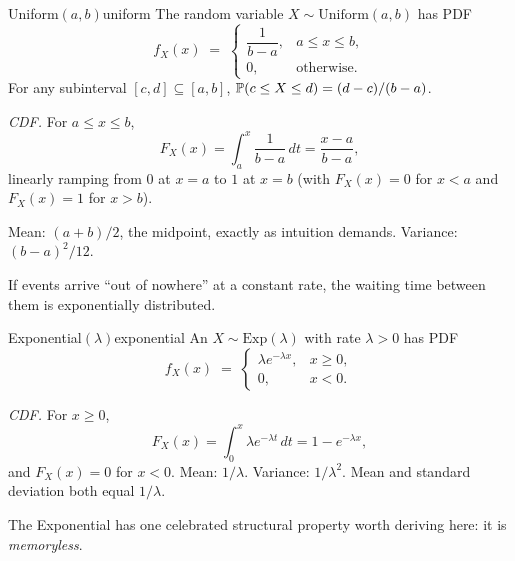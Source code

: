 \begin{example}{Uniform$(a, b)$}{uniform}
The  random variable $X \sim \mathrm{Uniform}(a, b)$ has PDF
\[
f_X(x) \;=\; \begin{cases} \dfrac{1}{b - a}, & a \le x \le b, \\ 0, & \text{otherwise.} \end{cases}
\]
For any subinterval $[c, d] \subseteq [a, b]$, $\mathbb{P}(c \le X \le d) = (d - c) / (b - a)$.

\textit{CDF.} For $a \le x \le b$,
\[
F_X(x) = \int_a^x \frac{1}{b - a}\, dt = \frac{x - a}{b - a},
\]
linearly ramping from $0$ at $x = a$ to $1$ at $x = b$ (with $F_X(x) = 0$ for $x < a$ and $F_X(x) = 1$ for $x > b$).

Mean: $(a + b)/2$, the midpoint, exactly as intuition demands. Variance: $(b - a)^2 / 12$.
\end{example}



If events arrive ``out of nowhere'' at a constant rate, the waiting time between them is exponentially distributed.

\begin{example}{Exponential$(\lambda)$}{exponential}
An  $X \sim \mathrm{Exp}(\lambda)$ with rate $\lambda > 0$ has PDF
\[
f_X(x) \;=\; \begin{cases} \lambda e^{-\lambda x}, & x \ge 0, \\ 0, & x < 0. \end{cases}
\]

\textit{CDF.} For $x \ge 0$,
\[
F_X(x) = \int_0^x \lambda e^{-\lambda t}\, dt = 1 - e^{-\lambda x},
\]
and $F_X(x) = 0$ for $x < 0$. Mean: $1/\lambda$. Variance: $1/\lambda^2$. Mean and standard deviation both equal $1/\lambda$.
\end{example}

The Exponential has one celebrated structural property worth deriving here: it is \emph{memoryless}.

